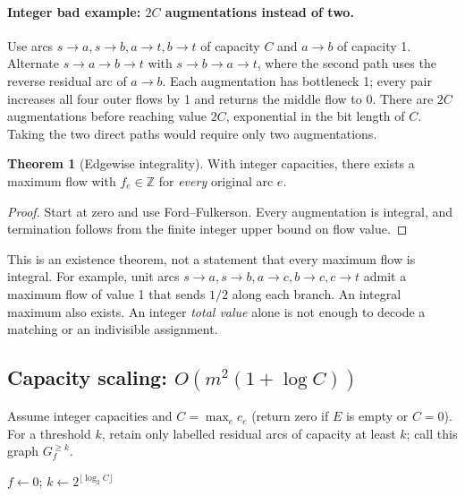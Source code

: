 \documentclass[10pt]{article}
\theoremstyle{definition}
\newtheorem{theorem}[definition]{Theorem}
\begin{document}
\paragraph{Integer bad example: $2C$ augmentations instead of two.}
Use arcs $s\to a,s\to b,a\to t,b\to t$ of capacity $C$ and
$a\to b$ of capacity 1. Alternate $s\to a\to b\to t$ with
$s\to b\to a\to t$, where the second path uses the reverse residual arc
of $a\to b$. Each augmentation has bottleneck 1; every pair increases all
four outer flows by 1 and returns the middle flow to 0. There are $2C$
augmentations before reaching value $2C$, exponential in the bit length of
$C$. Taking the two direct paths would require only two augmentations.

\begin{theorem}[Edgewise integrality]\label{nf:integrality}
With integer capacities, there exists a maximum flow with $f_e\in\mathbb Z$
for \emph{every} original arc $e$.
\end{theorem}
\begin{proof}
Start at zero and use Ford--Fulkerson. Every augmentation is integral, and
termination follows from the finite integer upper bound on flow value.
\end{proof}
This is an existence theorem, not a statement that every maximum flow is
integral. For example, unit arcs $s\to a,s\to b,a\to c,b\to c,c\to t$
admit a maximum flow of value 1 that sends $1/2$ along each branch.
An integral maximum also exists. An integer \emph{total value} alone is not
enough to decode a matching or an indivisible assignment.

\subsection{Capacity scaling: \texorpdfstring{$O(m^2(1+\log C))$}{O(m squared log C)}}\label{nf:scaling}
Assume integer capacities and $C=\max_e c_e$ (return zero if $E$ is empty or
$C=0$). For a threshold $k$, retain only labelled residual arcs of capacity
at least $k$; call this graph $G_f^{\ge k}$.

\begin{algorithm}[H]
\caption{Capacity scaling: augment only through residual capacities $\ge k$}
$f\gets0$; $k\gets2^{\lfloor\log_2 C\rfloor}$\;
\;
\end{algorithm}
\end{document}
